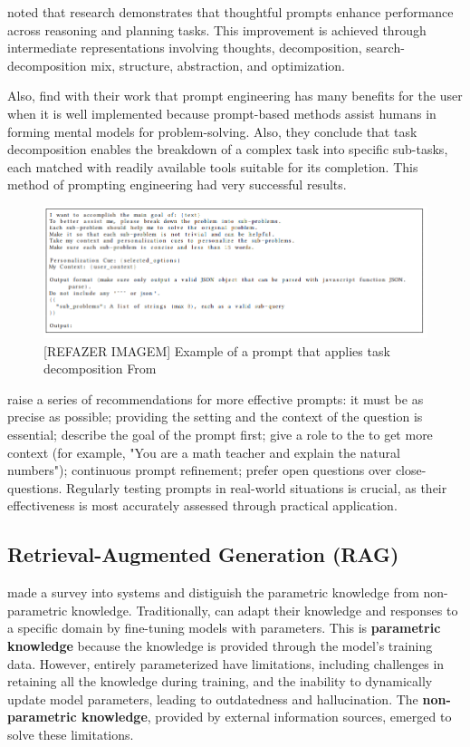 \citet{ma_beyond_2023} noted that research demonstrates that thoughtful prompts enhance {\llm} performance across reasoning and planning tasks. This improvement is achieved through intermediate representations involving thoughts, decomposition, search-decomposition mix, structure, abstraction, and optimization.

Also, \citet{ma_beyond_2023} find with their work that prompt engineering has many benefits for the user when it is well implemented because prompt-based methods assist humans in forming mental models for problem-solving. Also, they conclude that task decomposition enables the breakdown of a complex task into specific sub-tasks, each matched with readily available tools suitable for its completion. This method of prompting engineering had very successful results.

\begin{figure}[ht]
    \includegraphics[width=14cm]{figs/chapter2/prompt.png}
    \centering
    \caption{[REFAZER IMAGEM] Example of a prompt that applies task decomposition From \citet{ma_beyond_2023}}
\end{figure}


\citet{mesko_prompt_2023} raise a series of recommendations for more effective {\llm} prompts: it must be as precise as possible; providing the setting and the context of the question is essential; describe the goal of the prompt first; give a role to the {\llm} to get more context (for example, "You are a math teacher and explain the natural numbers"); continuous {\llm} prompt refinement; prefer open questions over close-questions. Regularly testing prompts in real-world situations is crucial, as their effectiveness is most accurately assessed through practical application.


\subsection{Retrieval-Augmented Generation (RAG)}

\citet{gao_retrieval-augmented_2023} made a survey into {\rag} systems and distiguish the parametric knowledge from non-parametric knowledge. Traditionally, {\llm} can adapt their knowledge and responses to a specific domain by fine-tuning models with parameters. This is \textbf{parametric knowledge} because the {\llm} knowledge is provided through the model's training data. However, entirely parameterized {\llm} have limitations, including challenges in retaining all the knowledge during training, and the inability to dynamically update model parameters, leading to outdatedness and hallucination. The \textbf{non-parametric knowledge}, provided by external information sources, emerged to solve these limitations.

